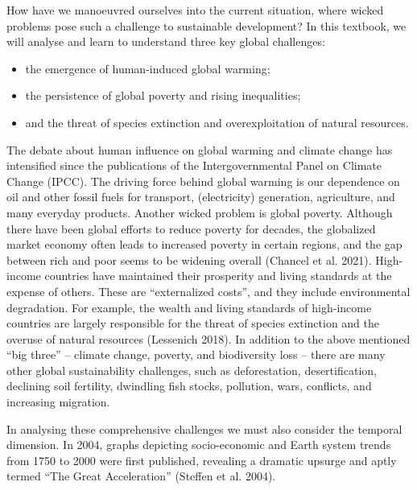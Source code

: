 \documentclass[
  a4paper,
  openany]{book}
\begin{document}
How have we manoeuvred ourselves into the current situation, where
wicked problems pose such a challenge to sustainable development? In
this textbook, we will analyse and learn to understand three key global
challenges:

\begin{itemize}
\item
  the emergence of human-induced global warming;
\item
  the persistence of global poverty and rising inequalities;
\item
  and the threat of species extinction and overexploitation of natural
  resources.
\end{itemize}

The debate about human influence on global warming and climate change
has intensified since the publications of the Intergovernmental Panel on
Climate Change (IPCC). The driving force behind global warming is our
dependence on oil and other fossil fuels for transport, (electricity)
generation, agriculture, and many everyday products. Another wicked
problem is global poverty. Although there have been global efforts to
reduce poverty for decades, the globalized market economy often leads to
increased poverty in certain regions, and the gap between rich and poor
seems to be widening overall (Chancel et al. 2021). High-income
countries have maintained their prosperity and living standards at the
expense of others. These are ``externalized costs'', and they include
environmental degradation. For example, the wealth and living standards
of high-income countries are largely responsible for the threat of
species extinction and the overuse of natural resources (Lessenich
2018). In addition to the above mentioned ``big three'' -- climate
change, poverty, and biodiversity loss -- there are many other global
sustainability challenges, such as deforestation, desertification,
declining soil fertility, dwindling fish stocks, pollution, wars,
conflicts, and increasing migration.

In analysing these comprehensive challenges we must also consider the
temporal dimension. In 2004, graphs depicting socio-economic and Earth
system trends from 1750 to 2000 were first published, revealing a
dramatic upsurge and aptly termed ``The Great Acceleration'' (Steffen et
al. 2004).
\end{document}
